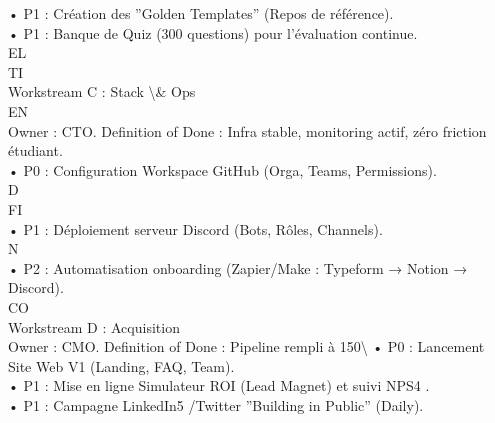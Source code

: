 \documentclass[12pt,landscape,a4paper]{article}
\begin{document}
• P1 : Création des ”Golden Templates” (Repos de référence).\\
\vspace{0.5em}
• P1 : Banque de Quiz (300 questions) pour l’évaluation continue.\\
\vspace{0.5em}
\vspace{0.5em}
\vspace{0.5em}
\vspace{0.5em}
EL\\
TI\\
Workstream C : Stack \textbackslash{}& Ops\\
\vspace{0.5em}
\vspace{0.5em}
\vspace{0.5em}
\vspace{0.5em}
EN\\
Owner : CTO. Definition of Done : Infra stable, monitoring actif, zéro friction étudiant.\\
\vspace{0.5em}
• P0 : Configuration Workspace GitHub (Orga, Teams, Permissions).\\
\vspace{0.5em}
\vspace{0.5em}
\vspace{0.5em}
\vspace{0.5em}
D\\
FI\\
• P1 : Déploiement serveur Discord (Bots, Rôles, Channels).\\
\vspace{0.5em}
\vspace{0.5em}
N\\
• P2 : Automatisation onboarding (Zapier/Make : Typeform → Notion → Discord).\\
CO\\
Workstream D : Acquisition\\
\vspace{0.5em}
Owner : CMO. Definition of Done : Pipeline rempli à 150\textbackslash{}%
\vspace{0.5em}
• P0 : Lancement Site Web V1 (Landing, FAQ, Team).\\
\vspace{0.5em}
• P1 : Mise en ligne Simulateur ROI (Lead Magnet) et suivi NPS4 .\\
\vspace{0.5em}
• P1 : Campagne LinkedIn5 /Twitter ”Building in Public” (Daily).\\
\end{document}
